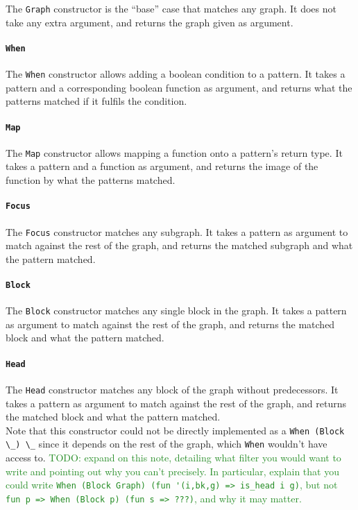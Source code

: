 \documentclass[11pt]{article}
\newcommand{\inlinecoq}[1]{\mbox{\lstinline[style=customcoq,columns=fixed,basewidth=.48em]{#1}}}
\newcommand{\ilc}[1]{\inlinecoq{#1}}
\newcommand{\yz}[1]{\textcolor{ForestGreen}{#1}}
\begin{document}
The \ilc{Graph} constructor is the ``base'' case that matches any graph. It does not take any extra argument, and returns the graph given as argument.

\paragraph{\ilc{When}}

The \ilc{When} constructor allows adding a boolean condition to a pattern.
It takes a pattern and a corresponding boolean function as argument, and returns what the patterns matched if it fulfils the condition.

\paragraph{\ilc{Map}}

The \ilc{Map} constructor allows mapping a function onto a pattern's return type.
It takes a pattern and a function as argument, and returns the image of the function by what the patterns matched.

\paragraph{\ilc{Focus}}

The \ilc{Focus} constructor matches any subgraph.
It takes a pattern as argument to match against the rest of the graph, and returns the matched subgraph and what the pattern matched.

\paragraph{\ilc{Block}}

The \ilc{Block} constructor matches any single block in the graph.
It takes a pattern as argument to match against the rest of the graph, and returns the matched block and what the pattern matched.

\paragraph{\ilc{Head}}

The \ilc{Head} constructor matches any block of the graph without predecessors.
It takes a pattern as argument to match against the rest of the graph, and returns the matched block and what the pattern matched.\\
Note that this constructor could not be directly implemented as a \ilc{When (Block \_) \_} since it depends on the rest of the graph, which \ilc{When} wouldn't have access to.
\yz{TODO: expand on this note, detailing what filter you would want to write and pointing out why you can't precisely.
In particular, explain that you could write \ilc{When (Block Graph) (fun '(i,bk,g) => is_head i g)}, but not \ilc{fun p => When (Block p) (fun s => ???)}, and why it may matter.}
\end{document}
